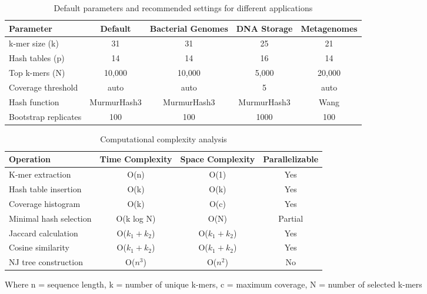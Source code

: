 \documentclass[12pt,a4paper]{article}
\begin{document}
\begin{table}[h]
\centering
\caption{Default parameters and recommended settings for different applications}
\label{tab:parameters}
\begin{tabular}{@{}lcccc@{}}
\toprule
Parameter & Default & Bacterial Genomes & DNA Storage & Metagenomes \\ \midrule
k-mer size (k) & 31 & 31 & 25 & 21 \\
Hash tables (p) & 14 & 14 & 16 & 14 \\
Top k-mers (N) & 10,000 & 10,000 & 5,000 & 20,000 \\
Coverage threshold & auto & auto & 5 & auto \\
Hash function & MurmurHash3 & MurmurHash3 & MurmurHash3 & Wang \\
Bootstrap replicates & 100 & 100 & 1000 & 100 \\ \bottomrule
\end{tabular}
\end{table}

\begin{table}[h]
\centering
\caption{Computational complexity analysis}
\label{tab:complexity}
\begin{tabular}{@{}lccc@{}}
\toprule
Operation & Time Complexity & Space Complexity & Parallelizable \\ \midrule
K-mer extraction & O(n) & O(1) & Yes \\
Hash table insertion & O(k) & O(k) & Yes \\
Coverage histogram & O(k) & O(c) & Yes \\
Minimal hash selection & O(k log N) & O(N) & Partial \\
Jaccard calculation & O($k_1 + k_2$) & O($k_1 + k_2$) & Yes \\
Cosine similarity & O($k_1 + k_2$) & O($k_1 + k_2$) & Yes \\
NJ tree construction & O($n^3$) & O($n^2$) & No \\ \bottomrule
\end{tabular}
\begin{tablenotes}
\small
\item Where n = sequence length, k = number of unique k-mers, c = maximum coverage, N = number of selected k-mers
\end{tablenotes}
\end{table}
\end{document}

